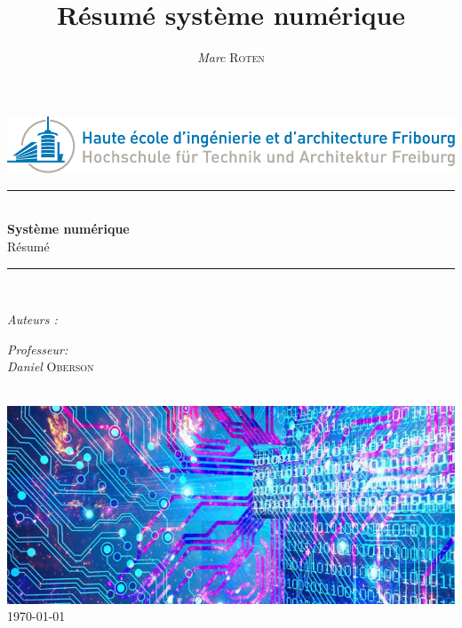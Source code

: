 

\title{Résumé système numérique} 
\author{\textsl{Marc} \textsc{Roten}}
\date{}


    \begin{titlepage}
        \begin{center}
            \includegraphics[scale=.4]{Img/heia-fr-logo.png}\\[1.3cm]
            
            \rule{\linewidth}{0.3mm} \\[0.3cm]
            {\huge \bfseries Système numérique\\[0.5cm]} 
            {\Large  Résumé }
            \rule{\linewidth}{0.3mm} \\[0.8cm]
            \noindent
            \begin{minipage}[t]{0.4\textwidth}
                \begin{flushleft} \large
                    \emph{Auteurs :}\\
                    \theauthor
                \end{flushleft}
            \end{minipage}
            \begin{minipage}[t]{0.4\textwidth} 
                \begin{flushright} \large
                    \emph{Professeur:}\\
                    \textsl{Daniel} \textsc{ Oberson}\\ 
                \end{flushright} 
                \vfill
            \end{minipage}\\[1.3cm]
            \includegraphics[scale=0.7]{Img/title.jpg}\\[1.5cm]
            \vspace*{1\baselineskip}
            \today \\[0.7cm]
        \end{center}
    \end{titlepage}
    \tableofcontents
    \clearpage


